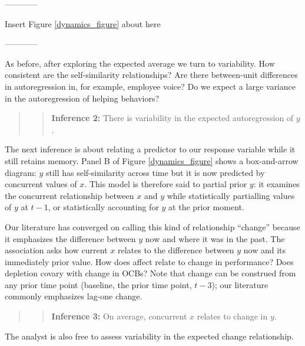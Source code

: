 \documentclass[english,,man]{apa6}
\theoremstyle{definition}
\theoremstyle{definition}
\theoremstyle{definition}
\theoremstyle{remark}
\begin{document}
\begin{center}

------------

Insert Figure \ref{dynamics_figure} about here

------------

\end{center}

As before, after exploring the expected average we turn to variability.
How consistent are the self-similarity relationships? Are there
between-unit differences in autoregression in, for example, employee
voice? Do we expect a large variance in the autoregression of helping
behaviors?

\begin{quote}
\begin{quote}
\textbf{Inference 2:} There is variability in the expected
autoregression of \(y\).
\end{quote}
\end{quote}

The next inference is about relating a predictor to our response
variable while it still retains memory. Panel B of Figure
\ref{dynamics_figure} shows a box-and-arrow diagram: \(y\) still has
self-similarity across time but it is now predicted by concurrent values
of \(x\). This model is therefore said to partial prior \(y\): it
examines the concurrent relationship between \(x\) and \(y\) while
statistically partialling values of \(y\) at \(t - 1\), or statistically
accounting for \(y\) at the prior moment.

Our literature has converged on calling this kind of relationship
\enquote{change} because it emphasizes the difference between \(y\) now
and where it was in the past. The association asks how current \(x\)
relates to the difference between \(y\) now and its immediately prior
value. How does affect relate to change in performance? Does depletion
covary with change in OCBs? Note that change can be construed from any
prior time point (baseline, the prior time point, \(t-3\)); our
literature commonly emphasizes lag-one change.

\begin{quote}
\begin{quote}
\textbf{Inference 3:} On average, concurrent \(x\) relates to change in
\(y\).
\end{quote}
\end{quote}

The analyst is also free to assess variability in the expected change
relationship.
\end{document}
